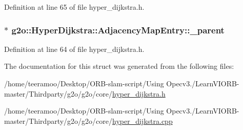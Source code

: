 Definition at line 65 of file hyper\+\_\+dijkstra.\+h.

\subsubsection[{\texorpdfstring{\+\_\+parent}{_parent}}]{$\ast$ g2o\+::\+Hyper\+Dijkstra\+::\+Adjacency\+Map\+Entry\+::\+\_\+parent\hspace{0.3cm}{\ttfamily [protected]}}\hypertarget{structg2o_1_1HyperDijkstra_1_1AdjacencyMapEntry_a3490ab9668c98d3e0cb14c54b9d41747}{}\label{structg2o_1_1HyperDijkstra_1_1AdjacencyMapEntry_a3490ab9668c98d3e0cb14c54b9d41747}


Definition at line 64 of file hyper\+\_\+dijkstra.\+h.



The documentation for this struct was generated from the following files\+:\begin{DoxyCompactItemize}
\item 
/home/teeramoo/\+Desktop/\+O\+R\+B-\/slam-\/script/\+Using Opecv3./\+Learn\+V\+I\+O\+R\+B-\/master/\+Thirdparty/g2o/g2o/core/\hyperlink{hyper__dijkstra_8h}{hyper\+\_\+dijkstra.\+h}\item 
/home/teeramoo/\+Desktop/\+O\+R\+B-\/slam-\/script/\+Using Opecv3./\+Learn\+V\+I\+O\+R\+B-\/master/\+Thirdparty/g2o/g2o/core/\hyperlink{hyper__dijkstra_8cpp}{hyper\+\_\+dijkstra.\+cpp}\end{DoxyCompactItemize}
